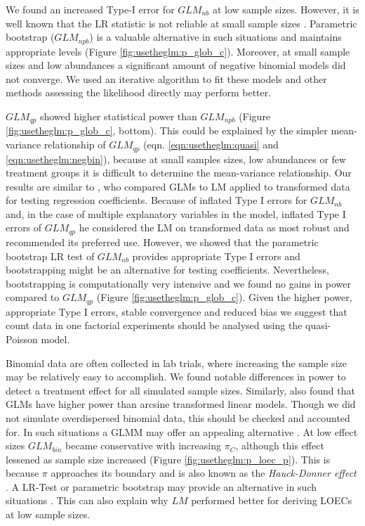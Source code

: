 We found an increased Type-I error for $GLM_{nb}$ at low sample sizes.
However, it is well known that the LR statistic is not reliable at small sample sizes \citep{bolker_generalized_2009,wilks_large-sample_1938}.
Parametric bootstrap ($GLM_{npb}$) is a valuable alternative in such situations and maintains appropriate levels (Figure \ref{fig:usetheglm:p_glob_c}).
Moreover, at small sample sizes and low abundances a significant amount of negative binomial models did not converge.
We used an iterative algorithm to fit these models \citep{venables_modern_2002} and other methods assessing the likelihood directly may perform better.

$GLM_{qp}$ showed higher statistical power than $GLM_{npb}$ (Figure \ref{fig:usetheglm:p_glob_c}, bottom).
This could be explained by the simpler mean-variance relationship of $GLM_{qp}$ (eqn. \ref{eqn:usetheglm:quasi} and \ref{eqn:usetheglm:negbin}), because at small samples sizes, low abundances or few treatment groups it is difficult to determine the mean-variance relationship.
Our results are similar to \citet{ives_for_2015}, who compared GLMs to LM applied to transformed data for testing regression coefficients.
Because of inflated Type I errors for $GLM_{nb}$ and, in the case of multiple explanatory variables in the model, inflated Type I errors of $GLM_{qp}$ he considered the LM on transformed data as most robust and recommended its preferred use.
However, we showed that the parametric bootstrap LR test of $GLM_{nb}$ provides appropriate Type I errors and bootstrapping might be an alternative for testing coefficients.
Nevertheless, bootstrapping is computationally very intensive and we found no gains in power compared to $GLM_{qp}$ (Figure \ref{fig:usetheglm:p_glob_c}). 
Given the higher power, appropriate Type I errors, stable convergence and reduced bias \citep{ohara_not_2010} we suggest that count data in one factorial experiments should be analysed using the quasi-Poisson model.

Binomial data are often collected in lab trials, where increasing the sample size may be relatively easy to accomplish. 
We found notable differences in power to detect a treatment effect for all simulated sample sizes.
Similarly, \citet{warton_arcsine_2011} also found that GLMs have higher power than arcsine transformed linear models.
Though we did not simulate overdispersed binomial data, this should be checked and accounted for.
In such situations a GLMM may offer an appealing alternative \citep{warton_arcsine_2011}.
At low effect sizes $GLM_{bin}$ became conservative with increasing $\pi_C$, although this effect lessened as sample size increased (Figure \ref{fig:usetheglm:p_loec_p}). 
This is because $\pi$ approaches its boundary and is also known as the \emph{Hauck-Donner effect} \citep{hauck_walds_1977}. A LR-Test or parametric bootstrap may provide an alternative in such situations \citep{bolker_generalized_2009}.
This can also explain why $LM$ performed better for deriving LOECs at low sample sizes.

